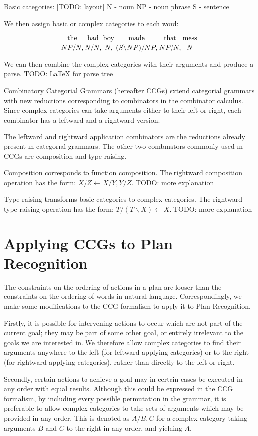 Basic categories:
[TODO: layout]
N - noun
NP - noun phrase
S - sentence

We then assign basic or complex categories to each word:

$$
{\text{the}\atop {NP/N,}}
{\text{bad}\atop {N/N,}}
{\text{boy}\atop {N,}}
{\text{made}\atop {(S \backslash NP)/NP,}}
{\text{that}\atop {NP/N,}}
{\text{mess}\atop {N}}
$$

We can then combine the complex categories with their arguments and produce a parse. 
TODO: LaTeX for parse tree

Combinatory Categorial Grammars (hereafter \ac{CCG}s) extend categorial grammars with new reductions corresponding to combinators in the combinator calculus. Since complex categories can take arguments either to their left or right, each combinator has a leftward and a rightward version.

The leftward and rightward application combinators are the reductions already present in categorial grammars. The other two combinators commonly used in CCGs are composition and type-raising.

Composition corresponds to function composition. The rightward composition operation has the form: $X/Z \leftarrow X/Y, Y/Z$. TODO: more explanation

Type-raising transforms basic categories to complex categories. The rightward type-raising operation has the form: $T/(T\backslash X) \leftarrow X$. TODO: more explanation

\section{Applying CCGs to Plan Recognition}

The constraints on the ordering of actions in a plan are looser than the constraints on the ordering of words in natural language. Correspondingly, we make some modifications to the \ac{CCG} formalism to apply it to Plan Recognition.

Firstly, it is possible for intervening actions to occur which are not part of the current goal; they may be part of some other goal, or entirely irrelevant to the goals we are interested in. We therefore allow complex categories to find their arguments anywhere to the left (for leftward-applying categories) or to the right (for rightward-applying categories), rather than directly to the left or right.

Secondly, certain actions to achieve a goal may in certain cases be executed in any order with equal results. Although this could be expressed in the \ac{CCG} formalism, by including every possible permutation in the grammar, it is preferable to allow complex categories to take sets of arguments which may be provided in any order. This is denoted as $A/{B, C}$ for a complex category taking arguments $B$ and $C$ to the right in any order, and yielding $A$.

